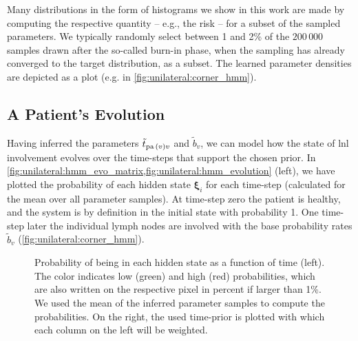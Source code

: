 \documentclass[\relativeRoot/main.tex]{subfiles}
\begin{document}
Many distributions in the form of histograms we show in this work are made by computing the respective quantity -- e.g., the risk -- for a subset of the sampled parameters. We typically randomly select between 1 and 2\% of the $200\,000$ samples drawn after the so-called burn-in phase, when the sampling has already converged to the target distribution, as a subset. The learned parameter densities are depicted as a  \cite{foreman-mackey_cornerpy_2016} plot (e.g. in \cref{fig:unilateral:corner_hmm}).

\subsection{A Patient's Evolution}
\label{subsec:unilateral:application:evolution}

Having inferred the parameters $\tilde{t}_{\operatorname{pa}{(v)}v}$ and $\tilde{b}_v$, we can model how the state of \gls{lnl} involvement evolves over the time-steps that support the chosen prior. In \cref{fig:unilateral:hmm_evo_matrix,fig:unilateral:hmm_evolution} (left), we have plotted the probability of each hidden state $\boldsymbol{\xi}_i$ for each time-step (calculated for the mean over all parameter samples). At time-step zero the patient is healthy, and the system is by definition in the initial state with probability 1. One time-step later the individual lymph nodes are involved with the base probability rates $\tilde{b}_v$ (\cref{fig:unilateral:corner_hmm}).

\begin{figure}
    \centering
    \def\svgwidth{1.0\textwidth}
    
    \caption[Matrix of probabilities for the system to be in any given state at any given time-step]{Probability of being in each hidden state as a function of time (left). The color indicates low (green) and high (red) probabilities, which are also written on the respective pixel in percent if larger than 1\%. We used the mean of the inferred parameter samples to compute the probabilities. On the right, the used time-prior is plotted with which each column on the left will be weighted.}
    \label{fig:unilateral:hmm_evo_matrix}
\end{figure}
\end{document}
